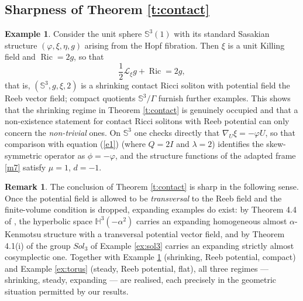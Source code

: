 \documentclass[a4paper, twoside, 10pt]{article}
\numberwithin{equation}{section}
\theoremstyle{definition}
\newtheorem{example}{Example}[section]
\newtheorem{remark}{Remark}[section]
\begin{document}
\subsection{Sharpness of Theorem \ref{t:contact}}

\begin{example}\label{ex:sphere}
Consider the unit sphere $\mathbb{S}^{3}(1)$ with its standard
Sasakian structure $\left(\varphi,\xi,\eta,g\right)$ arising from the
Hopf fibration. Then $\xi$ is a unit Killing field and $\operatorname{Ric}=2g$, so
that
\[
\frac{1}{2}\mathcal{L}_{\xi}g+\operatorname{Ric} = 2g,
\]
that is, $\left(\mathbb{S}^{3},g,\xi,2\right)$ is a shrinking contact
Ricci soliton with potential field the Reeb vector field; compact
quotients $\mathbb{S}^{3}/\Gamma$ furnish further examples. This shows
that the shrinking regime in Theorem \ref{t:contact} is genuinely
occupied and that a non-existence statement for contact Ricci solitons
with Reeb potential can only concern the \emph{non-trivial} ones. On
$\mathbb{S}^{3}$ one checks directly that $\nabla_{U}\xi=-\varphi U$,
so that comparison with equation (\ref{e1}) (where $Q=2I$ and
$\lambda=2$) identifies the skew-symmetric operator as
$\phi=-\varphi$, and the structure functions of the adapted frame
\eqref{m7} satisfy $\mu=1$, $d=-1$.
\end{example}

\begin{remark}\label{rem:sharpness}
The conclusion of Theorem \ref{t:contact} is sharp in the following
sense. Once the potential field is allowed to be \emph{transversal} to
the Reeb field and the finite-volume condition is dropped, expanding
examples do exist: by Theorem 4.4 of \cite{li2022ricci}, the
hyperbolic space $\mathbb{H}^{3}(-\alpha^{2})$ carries an expanding
homogeneous almost $\alpha$-Kenmotsu structure with a transversal
potential vector field, and by Theorem 4.1(i) of \cite{li2022ricci}
the group $Sol_{3}$ of Example \ref{ex:sol3} carries an expanding
strictly almost cosymplectic one. Together with Example
\ref{ex:sphere} (shrinking, Reeb potential, compact) and Example
\ref{ex:torus} (steady, Reeb potential, flat), all three regimes ---
shrinking, steady, expanding --- are realised, each precisely in the
geometric situation permitted by our results.
\end{remark}

\end{document}
